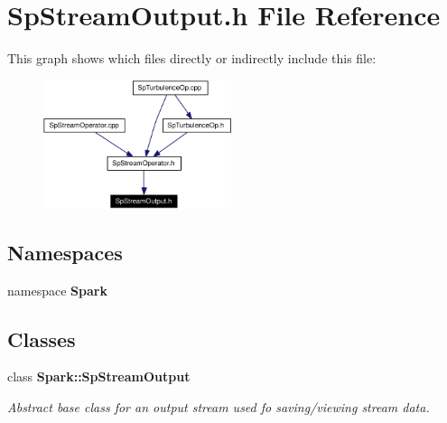 \section{Sp\-Stream\-Output.h File Reference}
\label{SpStreamOutput_8h}


This graph shows which files directly or indirectly include this file:\begin{figure}[H]
\begin{center}
\leavevmode
\includegraphics[width=156pt]{SpStreamOutput_8h__dep__incl}
\end{center}
\end{figure}
\subsection*{Namespaces}
\begin{CompactItemize}
\item 
namespace {\bf Spark}
\end{CompactItemize}
\subsection*{Classes}
\begin{CompactItemize}
\item 
class {\bf Spark::Sp\-Stream\-Output}
\begin{CompactList}\small\item\em Abstract base class for an output stream used fo saving/viewing stream data. \item\end{CompactList}\end{CompactItemize}
